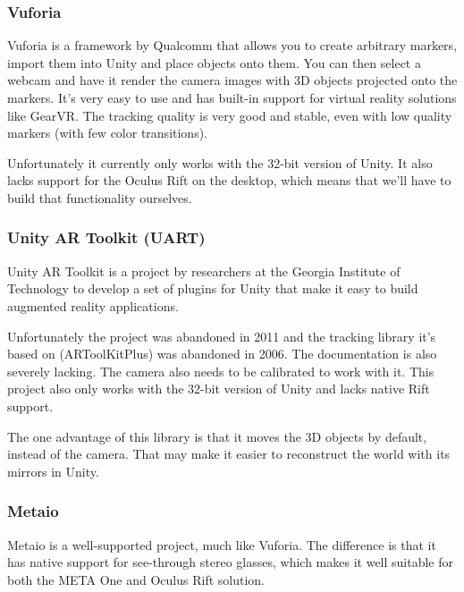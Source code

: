 			\subsubsection{Vuforia} \label{sssec:vuforia}
				Vuforia is a framework by Qualcomm that allows you to create
				arbitrary markers, import them into Unity and place objects onto
				them. You can then select a webcam and have it render the camera
				images with 3D objects projected onto the markers. It's very
				easy to use and has built-in support for virtual reality
				solutions like GearVR. The tracking quality is very good and
				stable, even with low quality markers (with few color
				transitions).

				Unfortunately it currently only works with the 32-bit version of
				Unity. It also lacks support for the Oculus Rift on the desktop,
				which means that we'll have to build that functionality
				ourselves.

			\subsubsection{Unity AR Toolkit (UART)} \label{sssec:uart}
				Unity AR Toolkit \cite{uart} is a project by researchers at the
				Georgia Institute of Technology to develop a set of plugins for
				Unity that make it easy to build augmented reality applications.

				Unfortunately the project was abandoned in 2011 and the tracking
				library it's based on (ARToolKitPlus) was abandoned in 2006. The
				documentation is also severely lacking. The camera also needs to
				be calibrated to work with it. This project also only works with
				the 32-bit version of Unity and lacks native Rift support.

				The one advantage of this library is that it moves the 3D
				objects by default, instead of the camera. That may make it
				easier to reconstruct the world with its mirrors in Unity.

			\subsubsection{Metaio} \label{sssec:metaio}
				Metaio is a well-supported project, much like Vuforia. The
				difference is that it has native support for see-through stereo
				glasses, which makes it well suitable for both the META One and
				Oculus Rift solution.

